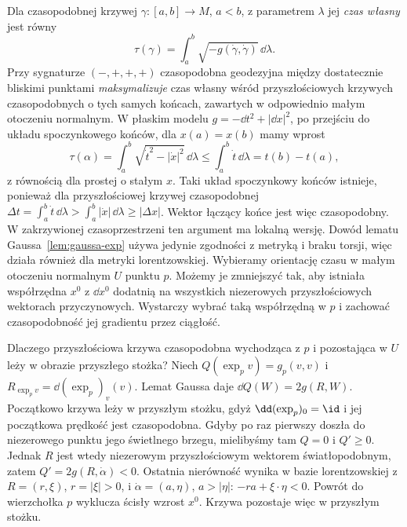 Dla czasopodobnej krzywej $\gamma:[a,b]\to M$,
$a<b$, z parametrem $\lambda$
jej \emph{czas własny} jest równy
\begin{equation}\label{eq:czas-wlasny}
 \tau(\gamma)=\int_a^b\sqrt{-g(\dot\gamma,\dot\gamma)}
                    \,\dd\lambda.
\end{equation}
Przy sygnaturze $(-,+,+,+)$ czasopodobna
geodezyjna między dostatecznie bliskimi
punktami \emph{maksymalizuje} czas własny
wśród przyszłościowych krzywych czasopodobnych o tych samych
końcach, zawartych w odpowiednio małym otoczeniu normalnym. W płaskim modelu
$g=-\dd t^2+|\dd x|^2$, po przejściu do
układu spoczynkowego końców, dla
$x(a)=x(b)$ mamy wprost
\[
 \tau(\alpha)=\int_a^b
 \sqrt{\dot t^2-|\dot x|^2}\,\dd\lambda
 \leq\int_a^b\dot t\,\dd\lambda=t(b)-t(a),
\]
z równością dla prostej o stałym $x$.
Taki układ spoczynkowy końców istnieje, ponieważ
dla przyszłościowej krzywej czasopodobnej
$\Delta t=\int_a^b\dot t\,\dd\lambda
>\int_a^b|\dot x|\,\dd\lambda\geq|\Delta x|$.
Wektor łączący końce jest więc czasopodobny.
W zakrzywionej czasoprzestrzeni ten argument
ma lokalną wersję. Dowód lematu
Gaussa~\ref{lem:gaussa-exp} używa jedynie
zgodności z metryką i braku torsji, więc
działa również dla metryki lorentzowskiej.
Wybieramy orientację czasu w małym otoczeniu normalnym $U$
punktu $p$. Możemy je zmniejszyć tak, aby istniała współrzędna
$x^0$ z $\dd x^0$ dodatnią na wszystkich niezerowych
przyszłościowych wektorach przyczynowych. Wystarczy wybrać taką współrzędną
w $p$ i zachować czasopodobność jej gradientu przez ciągłość.

Dlaczego przyszłościowa krzywa czasopodobna wychodząca z $p$
i pozostająca w $U$ leży w obrazie przyszłego stożka?
Niech $Q(\exp_p v)=g_p(v,v)$ i $R_{\exp_p v}=\dd(\exp_p)_v(v)$.
Lemat Gaussa daje $\dd Q(W)=2g(R,W)$.
Początkowo krzywa leży w przyszłym stożku, gdyż
$\dd(\exp_p)_0=\id$ i jej początkowa prędkość jest czasopodobna.
Gdyby po raz pierwszy doszła do niezerowego punktu jego
świetlnego brzegu, mielibyśmy tam $Q=0$ i $Q'\geq0$.
Jednak $R$ jest wtedy niezerowym przyszłościowym wektorem
światłopodobnym, zatem $Q'=2g(R,\dot\alpha)<0$.
Ostatnia nierówność wynika w bazie lorentzowskiej z
$R=(r,\xi)$, $r=|\xi|>0$, i $\dot\alpha=(a,\eta)$,
$a>|\eta|$: $-ra+\xi\cdot\eta<0$.
Powrót do wierzchołka $p$ wyklucza ścisły wzrost $x^0$.
Krzywa pozostaje więc w przyszłym stożku.

